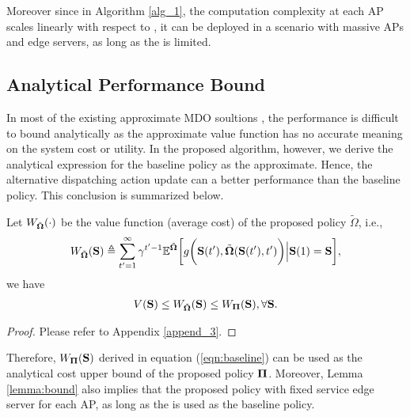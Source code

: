 Moreover since in Algorithm \ref{alg_1}, the computation complexity at each AP scales linearly with respect to , it can be deployed in a scenario with massive APs and edge servers, as long as the  is limited.

\subsection{Analytical Performance Bound}
\label{subsec:analysis}
In most of the existing approximate MDO soultions , the performance is difficult to bound analytically as the approximate value function has no accurate meaning on the system cost or utility.
In the proposed algorithm, however, we derive the analytical expression for the baseline policy as the approximate.
Hence, the alternative dispatching action update can  a better performance than the baseline policy.
This conclusion is summarized below.
\begin{lemma}
    \label{lemma:bound}
    Let $W_{\tilde{\boldsymbol{\Omega}}}(\cdot)$ be the value function (average cost) of the proposed policy $\tilde{\Omega}$, i.e.,
    \begin{align}
        W_{\tilde{\boldsymbol{\Omega}}}(\mathbf{S}) \triangleq
        \sum_{t'=1}^{\infty} \gamma^{t'-1} \mathbb{E}^{ \tilde{\boldsymbol{\Omega}} } \bigg[
            g\bigg(\mathbf{S}(t'), \tilde{\boldsymbol{\Omega}}(\mathbf{S}(t'),t')\bigg) \Big| \mathbf{S}(1)=\mathbf{S}
        \bigg],
    \end{align}
    we have
    \begin{align}
        V(\mathbf{S})
        \leq W_{\tilde{\boldsymbol{\Omega}}}(\mathbf{S})
        \leq W_{\boldsymbol{\Pi}}(\mathbf{S}),
        \forall \mathbf{S}.
    \end{align}
\end{lemma}
\begin{proof}
    Please refer to Appendix \ref{append_3}.
\end{proof}
Therefore, $W_{\boldsymbol{\Pi}}(\mathbf{S})$ derived in equation (\ref{eqn:baseline}) can be used as the analytical cost upper bound of the proposed policy $\boldsymbol{\Pi}$.
Moreover, Lemma \ref{lemma:bound} also implies that the proposed policy with fixed service edge server for each AP, as long as the  is used as the baseline policy.

